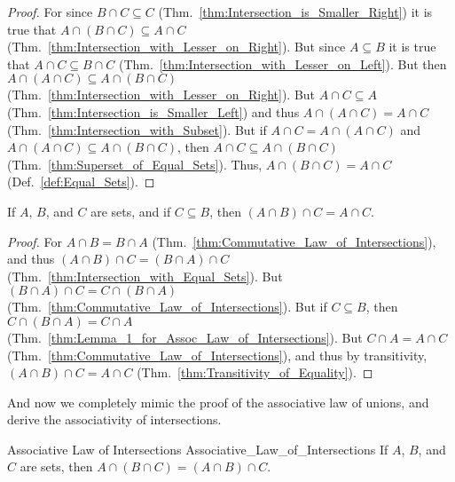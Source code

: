         \begin{proof}
            For since $B\cap{C}\subseteq{C}$
            (Thm.~\ref{thm:Intersection_is_Smaller_Right}) it is true that
            $A\cap(B\cap{C})\subseteq{A}\cap{C}$
            (Thm.~\ref{thm:Intersection_with_Lesser_on_Right}). But since
            $A\subseteq{B}$ it is true that $A\cap{C}\subseteq{B}\cap{C}$
            (Thm.~\ref{thm:Intersection_with_Lesser_on_Left}). But then
            $A\cap(A\cap{C})\subseteq{A}\cap(B\cap{C})$
            (Thm.~\ref{thm:Intersection_with_Lesser_on_Right}). But
            $A\cap{C}\subseteq{A}$ (Thm.~\ref{thm:Intersection_is_Smaller_Left})
            and thus $A\cap(A\cap{C})=A\cap{C}$
            (Thm.~\ref{thm:Intersection_with_Subset}). But if
            $A\cap{C}=A\cap(A\cap{C})$ and
            $A\cap(A\cap{C})\subseteq{A}\cap(B\cap{C})$, then
            $A\cap{C}\subseteq{A}\cap(B\cap{C})$
            (Thm.~\ref{thm:Superset_of_Equal_Sets}). Thus,
            $A\cap(B\cap{C})=A\cap{C}$ (Def.~\ref{def:Equal_Sets}).
        \end{proof}
        \begin{theorem}
            \label{thm:Lemma_2_for_Assoc_Law_of_Intersections}%
            If $A$, $B$, and $C$ are sets, and if $C\subseteq{B}$, then
            $(A\cap{B})\cap{C}=A\cap{C}$.
        \end{theorem}
        \begin{proof}
            For $A\cap{B}=B\cap{A}$
            (Thm.~\ref{thm:Commutative_Law_of_Intersections}), and thus
            $(A\cap{B})\cap{C}=(B\cap{A})\cap{C}$
            (Thm.~\ref{thm:Intersection_with_Equal_Sets}). But
            $(B\cap{A})\cap{C}=C\cap(B\cap{A})$
            (Thm.~\ref{thm:Commutative_Law_of_Intersections}). But if
            $C\subseteq{B}$, then $C\cap(B\cap{A})=C\cap{A}$
            (Thm.~\ref{thm:Lemma_1_for_Assoc_Law_of_Intersections}). But
            $C\cap{A}=A\cap{C}$
            (Thm.~\ref{thm:Commutative_Law_of_Intersections}), and thus by
            transitivity, $(A\cap{B})\cap{C}=A\cap{C}$
            (Thm.~\ref{thm:Transitivity_of_Equality}).
        \end{proof}
        And now we completely mimic the proof of the associative law of unions,
        and derive the associativity of intersections.
        \begin{ltheorem}{Associative Law of Intersections}
                        {Associative_Law_of_Intersections}
            If $A$, $B$, and $C$ are sets, then
            $A\cap(B\cap{C})=(A\cap{B})\cap{C}$.
        \end{ltheorem}
